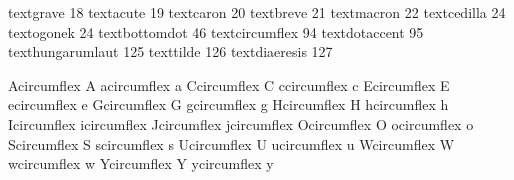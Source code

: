 

\startencoding[default]

 textgrave         18 
 textacute         19
 textcaron         20 
 textbreve         21
 textmacron        22
 textcedilla       24 
 textogonek        24 %
 textbottomdot     46  
 textcircumflex    94 
 textdotaccent     95
 texthungarumlaut 125
 texttilde        126 
 textdiaeresis    127

 Acircumflex {\buildtextaccent\textcircumflex A}
 acircumflex {\buildtextaccent\textcircumflex a}
 Ccircumflex {\buildtextaccent\textcircumflex C}
 ccircumflex {\buildtextaccent\textcircumflex c}
 Ecircumflex {\buildtextaccent\textcircumflex E}
 ecircumflex {\buildtextaccent\textcircumflex e}
 Gcircumflex {\buildtextaccent\textcircumflex G}
 gcircumflex {\buildtextaccent\textcircumflex g}
 Hcircumflex {\buildtextaccent\textcircumflex H}
 hcircumflex {\buildtextaccent\textcircumflex h}
 Icircumflex {\buildtextaccent\textcircumflex \dotlessI}
 icircumflex {\buildtextaccent\textcircumflex \dotlessi}
 Jcircumflex {\buildtextaccent\textcircumflex \dotlessJ}
 jcircumflex {\buildtextaccent\textcircumflex \dotlessj}
 Ocircumflex {\buildtextaccent\textcircumflex O}
 ocircumflex {\buildtextaccent\textcircumflex o}
 Scircumflex {\buildtextaccent\textcircumflex S}
 scircumflex {\buildtextaccent\textcircumflex s}
 Ucircumflex {\buildtextaccent\textcircumflex U}
 ucircumflex {\buildtextaccent\textcircumflex u}
 Wcircumflex {\buildtextaccent\textcircumflex W}
 wcircumflex {\buildtextaccent\textcircumflex w}
 Ycircumflex {\buildtextaccent\textcircumflex Y}
 ycircumflex {\buildtextaccent\textcircumflex y}

